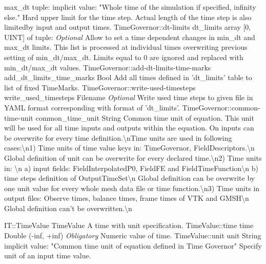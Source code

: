 \begin{RecordType}
			{max{\_}dt}
			{{tuple: }}{}
			{implicit value: "{Whole time of the simulation if specified, infinity else.}"}
			{{{Hard upper limit for the time step.
Actual length of the time step is also limitedby input and output times.}%
}}
		\RecKey
			{TimeGovernor::dt-limits}
			{dt{\_}limits}
			{{array [0, UINT] of }{tuple: }}{}
			{ \it{Optional}}
			{{{Allow to set a time dependent changes in min{\_}dt and max{\_}dt limits.
This list is processed at individual times overwriting previous setting of min{\_}dt/max{\_}dt.
Limits equal to 0 are ignored and replaced with min{\_}dt/max{\_}dt values.}%
}}
		\RecKey
			{TimeGovernor::add-dt-limits-time-marks}
			{add{\_}dt{\_}limits{\_}time{\_}marks}
			{{Bool}}{}
			{ }
			{{{Add all times defined in 'dt{\_}limits' table to list of fixed TimeMarks.}%
}}
		\RecKey
			{TimeGovernor::write-used-timesteps}
			{write{\_}used{\_}timesteps}
			{{Filename}}{}
			{ \it{Optional}}
			{{{Write used time steps to given file in YAML format corresponding with format of 'dt{\_}limits'.}%
}}
		\RecKey
			{TimeGovernor::common-time-unit}
			{common{\_}time{\_}unit}
			{{String}}{}
			{ }
			{{{Common time unit of equation.
This unit will be used for all time inputs and outputs within the equation.
On inputs can be overwrite for every time definition.{\textbackslash}nTime units are used in following cases:{\textbackslash}n1) Time units of time value keys in: TimeGovernor, FieldDescriptors.{\textbackslash}n   Global definition of unit can be overwrite for every declared time.{\textbackslash}n2) Time units in: {\textbackslash}n   a) input fields: FieldInterpolatedP0, FieldFE and FieldTimeFunction{\textbackslash}n   b) time steps definition of OutputTimeSet{\textbackslash}n   Global definition can be overwrite by one unit value for every whole mesh data file or time function.{\textbackslash}n3) Time units in output files: Observe times, balance times, frame times of VTK and GMSH{\textbackslash}n   Global definition can't be overwritten.{\textbackslash}n}%
}}
\end{RecordType}
\begin{TupleType}
	{IT::TimeValue}
	{TimeValue}
	{}%
	{}%
	{{{A time with unit specification.}%
}}
		\RecKey
			{TimeValue::time}
			{time}
			{{Double (-inf, +inf)}}{}
			{ \it{Obligatory}}
			{{{Numeric value of time.}%
}}
		\RecKey
			{TimeValue::unit}
			{unit}
			{{String}}{}
			{implicit value: "{Common time unit of equation defined in Time Governor}"}
			{{{Specify unit of an input time value.}%
}}
\end{TupleType}
